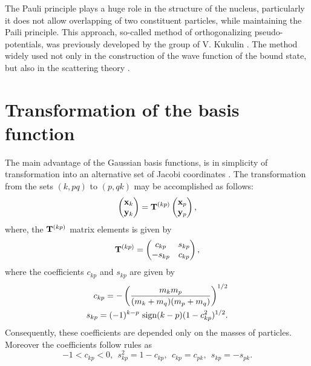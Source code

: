 \documentclass[
12pt, %
oneside, %
english, %
doublespacing, %
doublespacing, %
toctotoc, %
parskip, %
headsepline, %
]{MastersDoctoralThesis} %
\begin{document}
The Pauli principle plays a huge role in the structure of the nucleus, particularly it does not allow overlapping of two constituent particles, while maintaining the Paili principle.
This approach, so-called method of orthogonalizing pseudo-potentials, was previously developed by the group of V. Kukulin \cite{kukulin1978orthogonal}. The method widely used not only in the construction of the wave function of the bound state, but also in the scattering theory \cite{blokhintsev1993determination, tursunov2016theoretical}.

 \section{Transformation of the basis function }
The main advantage of the Gaussian basis functions,  
 is in simplicity of transformation into an alternative set of Jacobi coordinates \cite{suzuki1998stochastic}.
The transformation from the sets $(k,pq)$ to $(p,qk)$ may be accomplished as follows:
\begin{equation}
\begin{pmatrix}
{\bf x}_k \\ 
{\bf y}_k
\end{pmatrix}  = {\bf T}^{(kp)}
\begin{pmatrix}
{\bf x}_p \\ 
{\bf y}_p
\end{pmatrix},
\end{equation}
where, the ${\bf T}^{(kp)}$ matrix elements is given by \cite{faddeev1985quantum}
\begin{equation}
{\bf T}^{(kp)} = 
 \begin{pmatrix}
 c_{kp}&s_{kp} \\
 -s_{kp}&c_{kp} \\
 \end{pmatrix},
\end{equation}
where the coefficients $c_{kp}$ and $s_{kp}$ are given by 
\begin{align}
c_{kp}=-\left( \frac{m_k m_p}{(m_k+m_q)(m_p+m_q)} \right)^{1/2} \\
s_{kp}=(-1)^{k-p}~{\rm sign} (k-p) (1-c^2_{kp})^{1/2}.
\end{align} 
Consequently, these coefficients are depended only on the masses of particles. Moreover the coefficients follow rules as
\begin{equation}
-1<c_{kp}<0,~~s^2_{kp}=1-c_{kp},~~c_{kp}=c_{pk},~~ s_{kp}=-s_{pk}.
\end{equation}
\end{document}

